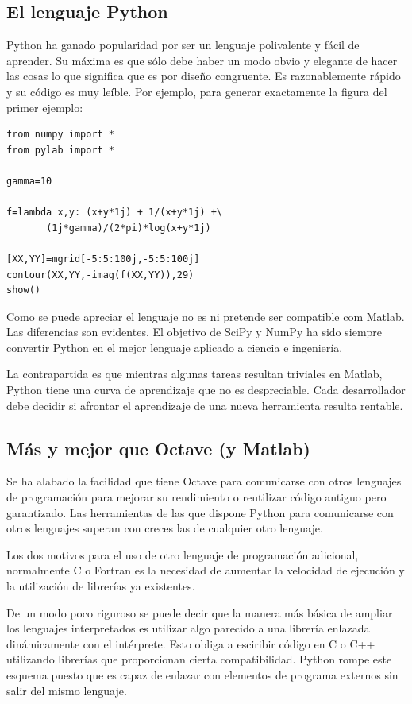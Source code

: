 \documentclass[10pt,letterpaper,conference]{ieeeconfspanish}
\begin{document}
\subsection*{El lenguaje Python}

Python ha ganado popularidad por ser un lenguaje polivalente y fácil
de aprender.  Su máxima es que sólo debe haber un modo obvio y
elegante de hacer las cosas lo que significa que es por diseño
congruente.  Es razonablemente rápido y su código es muy leíble.  Por
ejemplo, para generar exactamente la figura del primer ejemplo:

\begin{verbatim}
from numpy import *
from pylab import *

gamma=10

f=lambda x,y: (x+y*1j) + 1/(x+y*1j) +\
       (1j*gamma)/(2*pi)*log(x+y*1j)

[XX,YY]=mgrid[-5:5:100j,-5:5:100j]
contour(XX,YY,-imag(f(XX,YY)),29)
show()
\end{verbatim}

Como se puede apreciar el lenguaje no es ni pretende ser compatible
com Matlab. Las diferencias son evidentes.  El objetivo de SciPy y
NumPy ha sido siempre convertir Python en el mejor lenguaje aplicado a
ciencia e ingeniería.

La contrapartida es que mientras algunas tareas resultan triviales en
Matlab, Python tiene una curva de aprendizaje que no es
despreciable. Cada desarrollador debe decidir si afrontar el
aprendizaje de una nueva herramienta resulta rentable.

\subsection*{Más y mejor que Octave (y Matlab)}

Se ha alabado la facilidad que tiene Octave para comunicarse con otros
lenguajes de programación para mejorar su rendimiento o reutilizar
código antiguo pero garantizado.  Las herramientas de las que dispone
Python para comunicarse con otros lenguajes superan con creces las de
cualquier otro lenguaje.

Los dos motivos para el uso de otro lenguaje de programación
adicional, normalmente C o Fortran es la necesidad de aumentar la
velocidad de ejecución y la utilización de librerías ya
existentes.

De un modo poco riguroso se puede decir que la manera más básica de
ampliar los lenguajes interpretados es utilizar algo parecido a una
librería enlazada dinámicamente con el intérprete.  Esto obliga a
esciribir código en C o C++ utilizando librerías que proporcionan
cierta compatibilidad.  Python rompe este esquema puesto que es capaz
de enlazar con elementos de programa externos sin salir del mismo
lenguaje.
\end{document}
